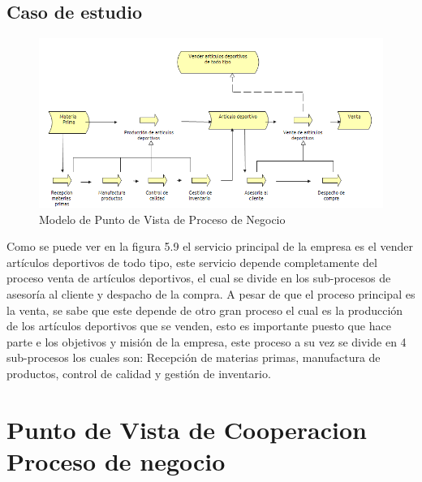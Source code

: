 \subsection{Caso de estudio}

\begin{figure}[th!]
	\centering
	\includegraphics[width=0.6\linewidth]{arquitectura/imagenes/VistaProcesoNegocio}
	\caption{Modelo de Punto de Vista de Proceso de Negocio \cite{pun5}}
	\label{fig:Modelo de punto de vista Proceso de Negocio}
\end{figure}


Como se puede ver en la figura 5.9 el servicio principal de la empresa es el vender artículos deportivos de todo tipo, este servicio depende completamente del proceso venta de artículos deportivos, el cual se divide en los sub-procesos de asesoría al cliente y despacho de la compra. 
\newline
A pesar de que el proceso principal es la venta, se sabe que este depende de otro gran proceso el cual es la producción de los artículos deportivos que se venden, esto es importante puesto que hace parte e los objetivos y misión de la empresa, este proceso a su vez se divide en 4 sub-procesos los cuales son: Recepción de materias primas, manufactura de productos, control de calidad y gestión de inventario.
\newpage

\section{Punto de Vista de Cooperacion Proceso de negocio}

